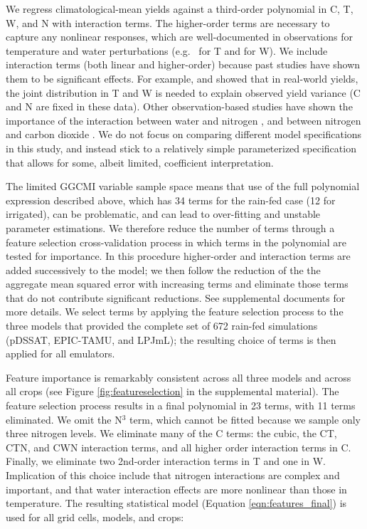 \documentclass[preprint, 5p, times, twocolumn]{elsarticle}
\begin{document}
We regress climatological-mean yields against a third-order polynomial in C, T, W, and N with interaction terms. The higher-order terms are necessary to capture any nonlinear responses, which are well-documented in observations for temperature and water perturbations (e.g.\ \citet{Schlenker2009} for T and \citet{He2016} for W). We include interaction terms (both linear and higher-order) because past studies have shown them to be significant effects. For example, \citet{Lobell2007} and \citet{Tebaldi2008} showed that in real-world yields, the joint distribution in T and W is needed to explain observed yield variance (C and N are fixed in these data). Other observation-based studies have shown the importance of the interaction between water and nitrogen \citep[e.g.\ ][]{AULAKH2005}, and between nitrogen and carbon dioxide \citep{Mitsuru92, Nakamura97}. We do not focus on comparing different model specifications in this study, and instead stick to a relatively simple parameterized specification that allows for some, albeit limited, coefficient interpretation. 

The limited GGCMI variable sample space means that use of the full polynomial expression described above, which has 34 terms for the rain-fed case (12 for irrigated), can be problematic, and can lead to over-fitting and unstable parameter estimations. We therefore reduce the number of terms through a feature selection cross-validation process in which terms in the polynomial are tested for importance. In this procedure higher-order and interaction terms are added successively to the model; we then follow the reduction of the the aggregate mean squared error with increasing terms and eliminate those terms that do not contribute significant reductions. See supplemental documents for more details. We select terms by applying the feature selection process to the three models that provided the complete set of 672 rain-fed simulations (pDSSAT, EPIC-TAMU, and LPJmL); the resulting choice of terms is then applied for all emulators. 

Feature importance is remarkably consistent across all three models and across all crops (see Figure \ref{fig:featureselection} in the supplemental material). The feature selection process results in a final polynomial in 23 terms, with 11 terms eliminated. We omit the N$^3$ term, which cannot be fitted because we sample only three nitrogen levels. We eliminate many of the C terms: the cubic, the CT, CTN, and CWN interaction terms, and all higher order interaction terms in C.  Finally, we eliminate two 2nd-order interaction terms in T and one in W. Implication of this choice include that nitrogen interactions are complex and important, and that water interaction effects are more nonlinear than those in temperature. The resulting statistical model (Equation \ref{eqn:features_final}) is used for all grid cells, models, and crops: 
\end{document}
